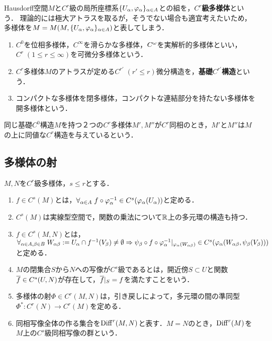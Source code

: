 \documentclass[uplatex,dvipdfmx]{jsreport}
\begin{document}
\begin{definition}[多様体]
    Hausdorff空間$M$と$C^r$級の局所座標系$\{U_\alpha,\varphi_\alpha\}_{\alpha\in A}$との組を，\textbf{$C^r$級多様体}という．
    理論的には極大アトラスを取るが，そうでない場合も適宜考えたいため，多様体を$M=M(M,\{U_\alpha,\varphi_\alpha\}_{\alpha\in A})$と表してしまう．
    \begin{enumerate}
        \item $C^0$を位相多様体，$C^\infty$を滑らかな多様体，$C^\omega$を実解析的多様体といい，$C^r\;(1\le r\le\infty)$を可微分多様体という．
        \item $C^r$多様体$M$のアトラスが定める$C^{r'}\;(r'\le r)$微分構造を，\textbf{基礎$C^{r'}$構造}という．
        \item コンパクトな多様体を閉多様体，コンパクトな連結部分を持たない多様体を開多様体という．
    \end{enumerate}
\end{definition}

\begin{definition}
    同じ基礎$C^0$構造$M$を持つ２つの$C^r$多様体$M',M''$が$C^r$同相のとき，$M'$と$M''$は$M$の上に同値な$C^r$構造を与えているという．
\end{definition}

\subsection{多様体の射}

\begin{definition}
    $M,N$を$C^r$級多様体，$s\le r$とする．
    \begin{enumerate}
        \item $f\in C^s(M)$とは，$\forall_{\alpha\in A}\;f\circ\varphi_\alpha^{-1}\in C^s(\varphi_\alpha(U_\alpha))$と定める．
        \item $C^s(M)$は実線型空間で，関数の乗法について$\mathbb{R}$上の多元環の構造も持つ．
        \item $f\in C^s(M,N)$とは，$\forall_{\alpha\in A,\beta\in B}\;W_{\alpha\beta}:=U_\alpha\cap f^{-1}(V_\beta)\ne\emptyset\Rightarrow \psi_\beta\circ f\circ\varphi_\alpha^{-1}|_{\varphi_\alpha(W_{\alpha\beta})}\in C^s(\varphi_\alpha(W_{\alpha\beta},\psi_\beta(V_\beta)))$と定める．
        \item $M$の閉集合$S$から$N$への写像が$C^s$級であるとは，開近傍$S\subset U$と関数$\overline{f}\in C^s(U,N)$が存在して，$\overline{f}|_{S}=f$を満たすことをいう．
        \item 多様体の射$\Phi\in C^r(M,N)$は，引き戻しによって，多元環の間の準同型$\Phi^*:C^r(N)\to C^r(M)$を定める．
        \item 同相写像全体の作る集合を$\mathrm{Diff}^r(M,N)$と表す．$M=N$のとき，$\mathrm{Diff}^r(M)$を$M$上の$C^s$級同相写像の群という．
    \end{enumerate}
\end{definition}
\end{document}
